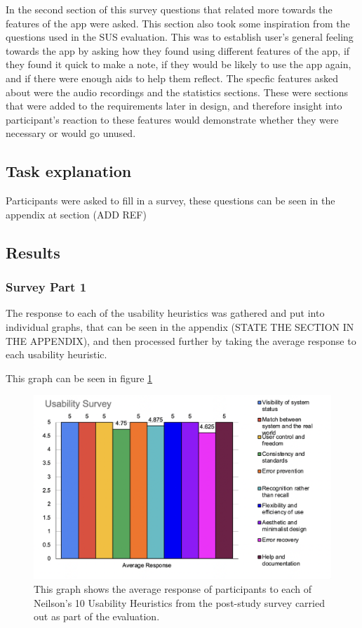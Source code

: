 \documentclass{l4proj}
\begin{document}
In the second section of this survey questions that related more towards the features of the app were asked. This section also took some inspiration from the questions used in the SUS evaluation. This was to establish user's general feeling towards the app by asking how they found using different features of the app, if they found it quick to make a note, if they would be likely to use the app again, and if there were enough aids to help them reflect. The specfic features asked about were the audio recordings and the statistics sections. These were sections that were added to the requirements later in design, and therefore insight into participant's reaction to these features would demonstrate whether they were necessary or would go unused. 

\subsection{Task explanation}

Participants were asked to fill in a survey, these questions can be seen in the appendix at section (ADD REF)

\subsection{Results}

\subsubsection{Survey Part 1}
 
The response to each of the usability heuristics was gathered and put into individual graphs, that can be seen in the appendix (STATE THE SECTION IN THE APPENDIX), and then processed further by taking the average response to each usability heuristic.

This graph can be seen in figure \ref{fig: UserStudyGraph}

\begin{figure}
    \begin{centering}
    \includegraphics[scale=0.75]{images/UserStudyGraph.png}
    \caption{This graph shows the average response of participants to each of Neilson's 10 Usability Heuristics from the post-study survey carried out as part of the evaluation.}
    \label{fig: UserStudyGraph}
    \end{centering}
\end{figure}
 
\end{document}
